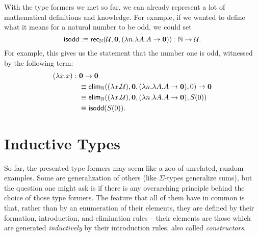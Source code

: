 With the type formers we met so far, we can already represent a lot of mathematical
definitions and knowledge.
For example, if we wanted to define what it means for a natural number to be odd,
we could set
\begin{equation*}
\mathsf{isodd} :\equiv \mathsf{rec}_{\mathbb{N}}(\mathcal{U}, \mathbf{0}, (\lambda n. \lambda A. A \to \mathbf{0})) : \mathbb{N} \to \mathcal{U} \text{.}
\end{equation*}
For example, this gives us the statement that the number one is odd, witnessed by
the following term:
\begin{align*}
(\lambda x. x) :~ & \mathbf{0} \to \mathbf{0} \\
 &\equiv \mathsf{elim}_{\mathbb{N}}((\lambda x. \mathcal{U}), \mathbf{0}, (\lambda n. \lambda A. A \to \mathbf{0}), 0)
  \to \mathbf{0}\\
 &\equiv \mathsf{elim}_{\mathbb{N}}((\lambda x. \mathcal{U}), \mathbf{0}, (\lambda n. \lambda A. A \to \mathbf{0}), S(0))\\
 &\equiv \mathsf{isodd}(S(0)) \text{.}
\end{align*}

\section{Inductive Types}\label{sec:tt-w}

So far, the presented type formers may seem like a zoo of unrelated,
random examples.
Some are generalization of others (like $\Sigma$-types generalize sums),
but the question one might ask is if there is any overarching principle behind
the choice of those type formers.
The feature that all of them have in common is that, rather than by an enumeration
of their elements,
they are defined by their formation, introduction, and elimination rules -- their
elements are those which are generated \emph{inductively} by their introduction
rules, also called \emph{constructors}.

